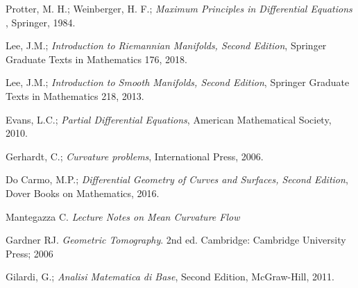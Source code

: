 \documentclass[a4paper, 12pt]{book}
\begin{document}
\begin{thebibliography}{11}
	
	  Protter, M. H.;  Weinberger, H. F.; {\em Maximum Principles in Differential Equations },  Springer, 1984. 
	
	
	 Lee, J.M.; {\em Introduction to Riemannian Manifolds, Second Edition},  Springer Graduate Texts in Mathematics 176, 2018. 
	
	 Lee, J.M.; {\em Introduction to Smooth Manifolds, Second Edition},  Springer Graduate Texts in Mathematics 218, 2013. 
	
	 Evans, L.C.; {\em Partial Differential Equations},  American Mathematical Society, 2010. 
	
	 Gerhardt, C.; {\em Curvature problems}, International Press, 2006.
	
	 Do Carmo, M.P.; {\em Differential Geometry of Curves and Surfaces, Second Edition},  Dover Books on Mathematics, 2016. 
	
	
	 Mantegazza C. {\em Lecture Notes on Mean Curvature Flow}
	
	
	 Gardner RJ. {\em Geometric Tomography}. 2nd ed. Cambridge: Cambridge University Press; 2006
	
	
	 Gilardi, G.; {\em Analisi Matematica di Base},  Second Edition,  McGraw-Hill, 2011. 
\end{thebibliography}
%
\end{document}
